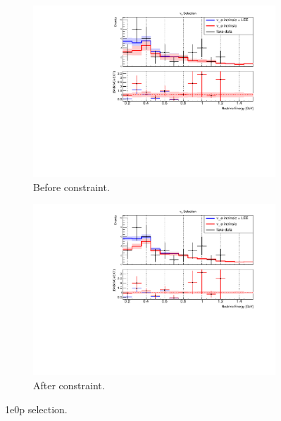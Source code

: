 \begin{figure}[H] 
\begin{center}
    \begin{subfigure}[b]{0.45\textwidth}
    \centering
    \includegraphics[width=1.00\textwidth]{Fakedata/set2/1e0p_numu_reco_e_H1_mc_fakedata_set2_nue_before_data_constraint.pdf}
    \caption{\label{fig:fakedata:set1:zp_before_constrain} Before constraint.}
    \end{subfigure}
    \begin{subfigure}[b]{0.45\textwidth}
    \centering
    \includegraphics[width=1.00\textwidth]{Fakedata/set2/1e0p_numu_reco_e_H1_mc_fakedata_set2_univ_overlay_nue.pdf}
    \caption{\label{fig:fakedata:set2:zp_after_constrain} After constraint.}
    \end{subfigure}
\caption{\label{fig:fakedata:set2:zp_const} 1e0p selection.}
\end{center}
\end{figure}

